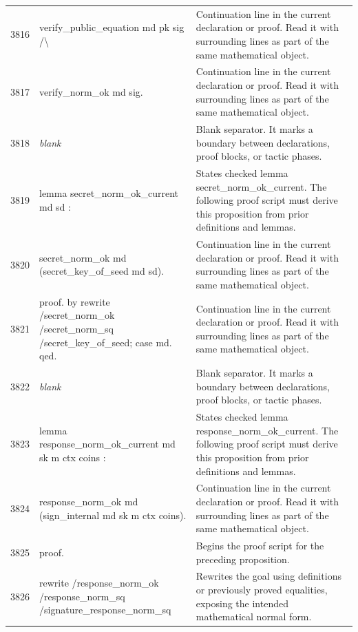 \documentclass[10pt]{article}
\begin{document}
\begin{longtable}{r L{0.53\textwidth} L{0.37\textwidth}}
3816 & {\ttfamily\scriptsize     verify\_public\_equation md pk sig /\textbackslash{}} & Continuation line in the current declaration or proof.  Read it with surrounding lines as part of the same mathematical object. \\
3817 & {\ttfamily\scriptsize     verify\_norm\_ok md sig.} & Continuation line in the current declaration or proof.  Read it with surrounding lines as part of the same mathematical object. \\
3818 & {\ttfamily\scriptsize \emph{blank}} & Blank separator.  It marks a boundary between declarations, proof blocks, or tactic phases. \\
3819 & {\ttfamily\scriptsize lemma secret\_norm\_ok\_current md sd :} & States checked lemma secret\_norm\_ok\_current.  The following proof script must derive this proposition from prior definitions and lemmas. \\
3820 & {\ttfamily\scriptsize   secret\_norm\_ok md (secret\_key\_of\_seed md sd).} & Continuation line in the current declaration or proof.  Read it with surrounding lines as part of the same mathematical object. \\
3821 & {\ttfamily\scriptsize proof. by rewrite /secret\_norm\_ok /secret\_norm\_sq /secret\_key\_of\_seed; case md. qed.} & Continuation line in the current declaration or proof.  Read it with surrounding lines as part of the same mathematical object. \\
3822 & {\ttfamily\scriptsize \emph{blank}} & Blank separator.  It marks a boundary between declarations, proof blocks, or tactic phases. \\
3823 & {\ttfamily\scriptsize lemma response\_norm\_ok\_current md sk m ctx coins :} & States checked lemma response\_norm\_ok\_current.  The following proof script must derive this proposition from prior definitions and lemmas. \\
3824 & {\ttfamily\scriptsize   response\_norm\_ok md (sign\_internal md sk m ctx coins).} & Continuation line in the current declaration or proof.  Read it with surrounding lines as part of the same mathematical object. \\
3825 & {\ttfamily\scriptsize proof.} & Begins the proof script for the preceding proposition. \\
3826 & {\ttfamily\scriptsize rewrite /response\_norm\_ok /response\_norm\_sq /signature\_response\_norm\_sq} & Rewrites the goal using definitions or previously proved equalities, exposing the intended mathematical normal form. \\

\end{longtable}
\end{document}
